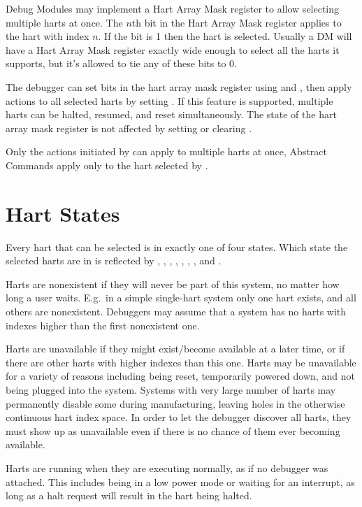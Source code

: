 Debug Modules may implement a Hart Array Mask register to allow selecting
multiple harts at once. The $n$th bit in the Hart Array Mask register applies to
the hart with index $n$. If the bit is 1 then the hart is selected.  Usually a DM
will have a Hart Array Mask register exactly wide enough to select all the
harts it supports, but it's allowed to tie any of these bits to 0.

The debugger can set bits in the hart array mask register using \Rhawindowsel
and \Rhawindow, then apply actions to all selected harts by setting \Fhasel. If
this feature is supported, multiple harts can be halted, resumed, and reset
simultaneously. The state of the hart array mask register is not affected by
setting or clearing \Fhasel.

Only the actions initiated by \Rdmcontrol can apply to multiple harts
at once, Abstract Commands apply only to the hart selected by
\Fhartsel.

\section{Hart States}

Every hart that can be selected is in exactly one of four states. Which state
the selected harts are in is reflected by \Fallnonexistent, \Fanynonexistent,
\Fallunavail, \Fanyunavail, \Fallrunning, \Fanyrunning, \Fallhalted, and
\Fanyhalted.

Harts are nonexistent if they will never be part of this system, no matter how
long a user waits. E.g.\ in a simple single-hart system only one hart exists,
and all others are nonexistent. Debuggers may assume that a system has no harts
with indexes higher than the first nonexistent one.

Harts are unavailable if they might exist/become available at a later time, or
if there are other harts with higher indexes than this one. Harts may be
unavailable for a variety of reasons including being reset, temporarily powered
down, and not being plugged into the system.
Systems with very large number of harts may
permanently disable some during manufacturing, leaving holes in the otherwise
continuous hart index space. In order to let the debugger discover all harts,
they must show up as unavailable even if there is no chance of them ever
becoming available.

Harts are running when they are executing normally, as if no debugger was
attached. This includes being in a low power mode or waiting for an interrupt,
as long as a halt request will result in the hart being halted.

